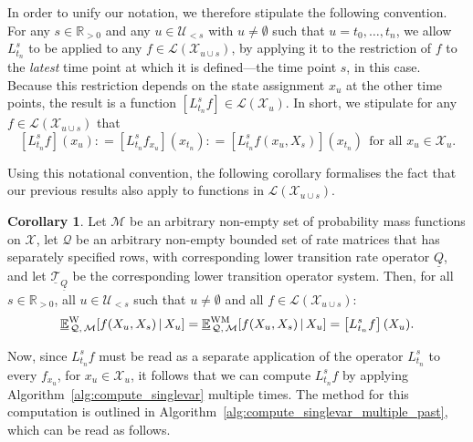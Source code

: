 \documentclass[10pt,a4paper]{paper}
\theoremstyle{definition}
\newtheorem{corollary}[theorem]{Corollary}
\newcommand{\reals}{\mathbb{R}}
\newcommand{\realspos}{\reals_{>0}}
\newcommand{\states}{\mathcal{X}}
\newcommand{\gambles}{\mathcal{L}}
\newcommand{\rateset}{\mathcal{Q}}
\newcommand{\lrate}{\underline{Q}}
\newcommand{\coloneqq}{:\!=}
\begin{document}
In order to unify our notation, we therefore stipulate the following convention. For any $s\in\realspos$ and any $u\in\mathcal{U}_{<s}$ with $u\neq\emptyset$ such that $u=t_0,\ldots,t_n$, we allow $L_{t_n}^s$ to be applied to any $f\in\gambles(\states_{u\cup s})$, by applying it to the restriction of $f$ to the \emph{latest} time point at which it is defined---the time point $s$, in this case. Because this restriction depends on the state assignment $x_u$ at the other time points, the result is a function $[L_{t_n}^sf]\in\gambles(\states_u)$. In short, we stipulate for any $f\in\gambles(\states_{u\cup s})$ that
\begin{equation}\label{eq:applyLtolargerfunctions}
[L_{t_n}^sf](x_u) \coloneqq [L_{t_n}^sf_{x_u}](x_{t_n}) \coloneqq [L_{t_n}^sf(x_u,X_s)](x_{t_n})
~~\text{for all $x_u\in\states_u$}.
\end{equation}

Using this notational convention, the following corollary formalises the fact that our previous results also apply to functions in $\gambles(\states_{u\cup s})$.

\begin{corollary}\label{cor:inf_works_for_single_future_var}
Let $\mathcal{M}$ be an arbitrary non-empty set of probability mass functions on $\states$, let $\rateset$ be an arbitrary non-empty bounded set of rate matrices that has separately specified rows, with corresponding lower transition rate operator $\lrate$, and let $\underline{\mathcal{T}}_{\lrate}$ be the corresponding lower transition operator system. Then, for all $s\in\realspos$, all $u\in\mathcal{U}_{<s}$ such that $u\neq\emptyset$ and all $f\in\gambles(\states_{u\cup s})$:
\begin{equation*}
\underline{\mathbb{E}}^\mathrm{W}_{\,\rateset,\,\mathcal{M}}[f(X_u,X_s)\,\vert\,X_u]=\underline{\mathbb{E}}^{\mathrm{WM}}_{\,\rateset,\,\mathcal{M}}[f(X_u,X_s)\,\vert\,X_u]=\left[L_{t_n}^s f\right](X_u).\vspace{3pt}
\end{equation*}
\end{corollary}

Now, since $L_{t_n}^sf$ must be read as a separate application of the operator $L_{t_n}^s$ to every $f_{x_u}$, for $x_u\in\states_u$, it follows that we can compute $L_{t_n}^sf$ by applying Algorithm~\ref{alg:compute_singlevar} multiple times.
The method for this computation is outlined in Algorithm~\ref{alg:compute_singlevar_multiple_past}, which can be read as follows. 
\end{document}
